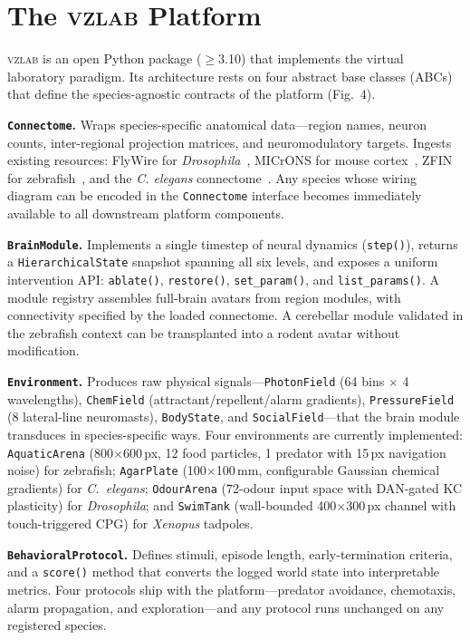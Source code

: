 \documentclass[12pt,a4paper]{article}
\begin{document}
\section*{The \textsc{vzlab} Platform}

\textsc{vzlab} is an open Python package ($\geq$3.10) that
implements the virtual laboratory paradigm.
Its architecture rests on four abstract base classes (ABCs) that
define the species-agnostic contracts of the platform (Fig.~4).

\textbf{\texttt{Connectome}.}
Wraps species-specific anatomical data---region names, neuron counts,
inter-regional projection matrices, and neuromodulatory targets.
Ingests existing resources: FlyWire for
\textit{Drosophila}~\cite{dorkenwald2024}, MICrONS for mouse
cortex~\cite{microns2021}, ZFIN for zebrafish~\cite{bradford2022},
and the \textit{C. elegans} connectome~\cite{white1986}.
Any species whose wiring diagram can be encoded in the
\texttt{Connectome} interface becomes immediately available to all
downstream platform components.

\textbf{\texttt{BrainModule}.}
Implements a single timestep of neural dynamics (\texttt{step()}),
returns a \texttt{HierarchicalState} snapshot spanning all six
levels, and exposes a uniform intervention API: \texttt{ablate()},
\texttt{restore()}, \texttt{set\_param()}, and \texttt{list\_params()}.
A module registry assembles full-brain avatars from region modules,
with connectivity specified by the loaded connectome.
A cerebellar module validated in the zebrafish context can be
transplanted into a rodent avatar without modification.

\textbf{\texttt{Environment}.}
Produces raw physical signals---\texttt{PhotonField} (64 bins $\times$
4 wavelengths), \texttt{ChemField} (attractant/repellent/alarm
gradients), \texttt{PressureField} (8 lateral-line neuromasts),
\texttt{BodyState}, and \texttt{SocialField}---that the brain module
transduces in species-specific ways.
Four environments are currently implemented: \texttt{AquaticArena}
(800$\times$600\,px, 12 food particles, 1 predator with 15\,px
navigation noise) for zebrafish; \texttt{AgarPlate}
(100$\times$100\,mm, configurable Gaussian chemical gradients)
for \textit{C.~elegans}; \texttt{OdourArena}
(72-odour input space with DAN-gated KC plasticity)
for \textit{Drosophila}; and \texttt{SwimTank}
(wall-bounded 400$\times$300\,px channel with touch-triggered CPG)
for \textit{Xenopus} tadpoles.

\textbf{\texttt{BehavioralProtocol}.}
Defines stimuli, episode length, early-termination criteria, and
a \texttt{score()} method that converts the logged world state into
interpretable metrics.
Four protocols ship with the platform---predator avoidance,
chemotaxis, alarm propagation, and exploration---and any protocol
runs unchanged on any registered species.
\end{document}
